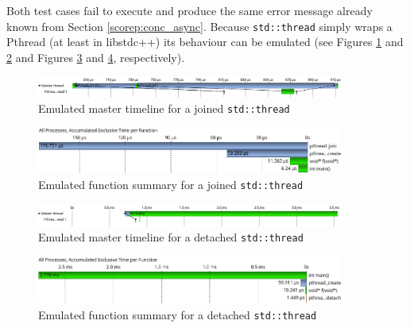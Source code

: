 Both test cases fail to execute and produce the same error message already known from Section \ref{scorep:conc_async}. Because \texttt{std::thread} simply wraps a Pthread (at least in libstdc++) its behaviour can be emulated (see Figures \ref{scorep:conc_pthread_join_timeline} and \ref{scorep:conc_pthread_join_summary} and Figures \ref{scorep:conc_pthread_detach_timeline} and \ref{scorep:conc_pthread_detach_summary}, respectively).

\begin{figure}[htbp]
	\begin{center}
		\includegraphics[width=0.9\textwidth]{img/scorep_pthread_join_timeline.png}
		\caption{Emulated master timeline for a joined \texttt{std::thread}}
		\label{scorep:conc_pthread_join_timeline}
	\end{center}
\end{figure}

\begin{figure}[htbp]
	\begin{center}
		\includegraphics[width=0.9\textwidth]{img/scorep_pthread_join_summary.png}
		\caption{Emulated function summary for a joined \texttt{std::thread}}
		\label{scorep:conc_pthread_join_summary}
	\end{center}
\end{figure}

\begin{figure}[htbp]
	\begin{center}
		\includegraphics[width=0.9\textwidth]{img/scorep_pthread_detach_timeline.png}
		\caption{Emulated master timeline for a detached \texttt{std::thread}}
		\label{scorep:conc_pthread_detach_timeline}
	\end{center}
\end{figure}

\begin{figure}[htbp]
	\begin{center}
		\includegraphics[width=0.9\textwidth]{img/scorep_pthread_detach_summary.png}
		\caption{Emulated function summary for a detached \texttt{std::thread}}
		\label{scorep:conc_pthread_detach_summary}
	\end{center}
\end{figure}


